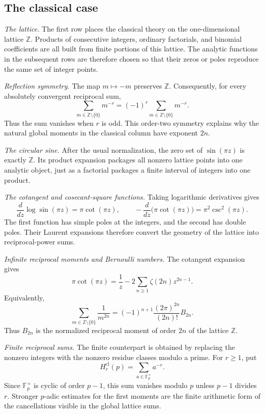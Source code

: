 \documentclass[a4paper,american,11pt]{amsart}
\numberwithin{equation}{section}
\theoremstyle{definition}
\newcommand{\Z}{\mathbb Z}
\newcommand{\F}{\mathbb F}
\begin{document}
\subsection{The classical case}\label{subsec:classical-column}

\emph{The lattice.}
The first row places the classical theory on the one-dimensional lattice $\Z$. Products of consecutive integers, ordinary factorials, and binomial coefficients are all built from finite portions of this lattice. The analytic functions in the subsequent rows are therefore chosen so that their zeros or poles reproduce the same set of integer points.

\emph{Reflection symmetry.}
The map $m\mapsto-m$ preserves $\Z$. Consequently, for every absolutely convergent reciprocal sum,
\[
\sum_{m\in\Z\setminus\{0\}}m^{-r}
=(-1)^r\sum_{m\in\Z\setminus\{0\}}m^{-r}.
\]
Thus the sum vanishes when $r$ is odd. This order-two symmetry explains why the natural global moments in the classical column have exponent $2n$.

\emph{The circular sine.}
After the usual normalization, the zero set of $\sin(\pi z)$ is exactly $\Z$. Its product expansion packages all nonzero lattice points into one analytic object, just as a factorial packages a finite interval of integers into one product.

\emph{The cotangent and cosecant-square functions.}
Taking logarithmic derivatives gives
\[
\frac{d}{dz}\log\sin(\pi z)=\pi\cot(\pi z),
\qquad
-\frac{d}{dz}\bigl(\pi\cot(\pi z)\bigr)=\pi^2\csc^2(\pi z).
\]
The first function has simple poles at the integers, and the second has double poles. Their Laurent expansions therefore convert the geometry of the lattice into reciprocal-power sums.

\emph{Infinite reciprocal moments and Bernoulli numbers.}
The cotangent expansion gives
\[
\pi\cot(\pi z)
=
\frac1z-2\sum_{n\geq1}\zeta(2n)z^{2n-1}.
\]
Equivalently,
\[
\sum_{m\in\Z\setminus\{0\}}\frac1{m^{2n}}
=
(-1)^{n+1}\frac{(2\pi)^{2n}}{(2n)!}B_{2n}.
\]
Thus $B_{2n}$ is the normalized reciprocal moment of order $2n$ of the lattice $\Z$.

\emph{Finite reciprocal sums.}
The finite counterpart is obtained by replacing the nonzero integers with the nonzero residue classes modulo a prime. For $r\geq1$, put
\[
H_r^{\mathrm{cl}}(p)
=
\sum_{a\in\F_p^\times}a^{-r}.
\]
Since $\F_p^\times$ is cyclic of order $p-1$, this sum vanishes modulo $p$ unless $p-1$ divides $r$. Stronger $p$-adic estimates for the first moments are the finite arithmetic form of the cancellations visible in the global lattice sums.
\end{document}
